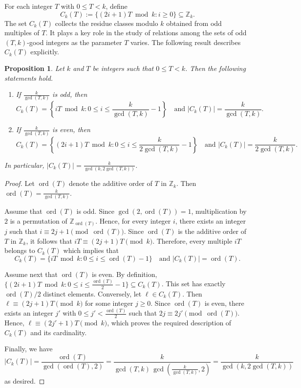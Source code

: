 \documentclass[pdflatex,sn-mathphys-num]{sn-jnl}%
\theoremstyle{thmstyleone}%
\newtheorem{proposition}[theorem]{Proposition}%
\theoremstyle{thmstyletwo}%
\theoremstyle{thmstylethree}%
\newcommand{\Z}{\mathbb{Z}}
\newcommand{\ord}{\operatorname{ord}}
\begin{document}
For each integer $T$ with $0\le T<k$, define
\[
C_k(T):=\{(2i+1)T \bmod k : i\ge 0\}\subseteq \Z_k.
\]
The set $C_k(T)$ collects the residue classes modulo $k$ obtained from odd multiples of $T$. It plays a key role in the study of relations among the sets of odd $(T,k)$-good integers as the parameter $T$ varies. The following result describes $C_k(T)$ explicitly.

\begin{proposition}\label{prop:CkT}
Let $k$ and $T$ be   integers  such that $0\le T<k$. Then the following statements hold.
\begin{enumerate}[$(1)$]
\item If
$
\frac{k}{\gcd(T,k)}
$
is odd, then
\[
C_k(T)=\left\{iT \bmod k : 0\le i\le \frac{k}{\gcd(T,k)}-1\right\}
\quad \text{and }
|C_k(T)|=\frac{k}{\gcd(T,k)}.
\]

\item If
$
\frac{k}{\gcd(T,k)}
$
is even, then
\[
C_k(T)=\left\{(2i+1)T \bmod k : 0\le i\le \frac{k}{2\gcd(T,k)}-1\right\}
\quad \text{and }
|C_k(T)|=\frac{k}{2\gcd(T,k)}.
\]
\end{enumerate}
In particular,
$
|C_k(T)|=\frac{k}{\gcd(k,2\gcd(T,k))}$.
\end{proposition}

\begin{proof}  Let $\ord(T)$ denote the additive order of $T$ in  $\Z_k$. Then  
$
\ord(T)=\frac{k}{\gcd(T,k)}$. 


Assume that $\ord(T)$ is odd. Since $\gcd(2,\ord(T))=1$, multiplication by $2$ is a permutation of $\Z_{\ord(T)}$. Hence, for every integer $i$, there exists an integer $j$ such that
$
i\equiv 2j+1 \pmod{\ord(T)}$.
Since $\ord(T)$ is the additive order of $T$ in $\Z_k$, it follows that
$
iT\equiv (2j+1)T \pmod{k}$.
  Therefore,  every multiple $iT$ belongs to $C_k(T)$ which implies that 
\[
C_k(T)=\{iT \bmod k : 0\le i\le \ord(T)-1\}\quad \text{and }
|C_k(T)|=\ord(T).
\]

Assume next that $\ord(T)$ is even. By definition, $
\{(2i+1)T \bmod k : 0\le i\le \tfrac{\ord(T)}{2}-1\}\subseteq C_k(T)$.
This set has exactly $\ord(T)/2$ distinct elements. Conversely, let $\ell\in C_k(T)$. Then
$
\ell\equiv (2j+1)T \pmod k$
for some integer $j\ge 0$. Since $\ord(T)$ is even, there exists an integer $j'$ with
$
0\le j'<\frac{\ord(T)}{2}$
such that
$
2j\equiv 2j' \pmod{\ord(T)}$.
Hence,
$
\ell\equiv (2j'+1)T \pmod k$,
which proves the required description of $C_k(T)$ and its cardinality.

Finally, we have 
\[
|C_k(T)|=\frac{\ord(T)}{\gcd(\ord(T),2)}
=
\frac{k}{\gcd(T,k)\,\gcd\!\left(\frac{k}{\gcd(T,k)},2\right)}
=
\frac{k}{\gcd(k,2\gcd(T,k))}
\] as desired.
\end{proof}
\end{document}
